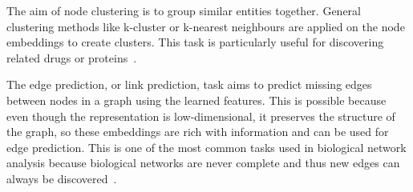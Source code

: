 The aim of node clustering is to group similar entities together.
General clustering methods like k-cluster or k-nearest neighbours are applied on the node embeddings to create clusters.
This task is particularly useful for discovering related drugs or proteins~\cite{hamilton_representation_nodate}.

The edge prediction, or link prediction, task aims to predict missing edges between nodes in a graph using the learned features.
This is possible because even though the representation is low-dimensional, it preserves the structure of the graph, so these embeddings are rich with information and can be used for edge prediction.
This is one of the most common tasks used in biological network analysis because biological networks are never complete and thus new edges can always be discovered~\cite{hamilton_representation_nodate}.
